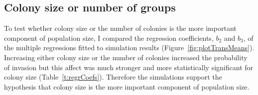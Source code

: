\subsection{Colony size or number of groups}

To test whether colony size or the number of colonies is the more important component of population size, I compared the regression coefficients, $b_2$ and $b_3$, of the multiple regressions fitted to simulation results (Figure~\ref{fig:plotTransMeans}).
Increasing either colony size or the number of colonies increased the probability of invasion but this affect was much stronger and more statistically significant for colony size (Table~\ref{t:regrCoefs}).
Therefore the simulations support the hypothesis that colony size is the more important component of population size.




